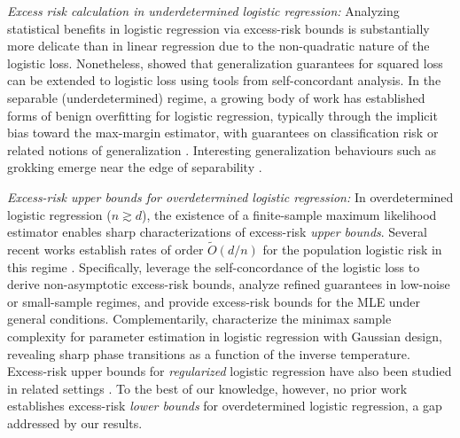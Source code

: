 \documentclass{article}
\theoremstyle{plain}
\theoremstyle{definition}
\theoremstyle{remark}
\begin{document}
{\textit{Excess risk calculation in underdetermined logistic regression:} Analyzing statistical benefits in logistic regression via excess-risk bounds is substantially more delicate than in linear regression due to the non-quadratic nature of the logistic loss. Nonetheless, \citet{bach2010self} showed that generalization guarantees for squared loss can be extended to logistic loss using tools from self-concordant analysis. In the separable (underdetermined) regime, a growing body of work has established forms of benign overfitting for logistic regression, typically through the implicit bias toward the max-margin estimator, with guarantees on classification risk or related notions of generalization \cite{montanari2019generalization, chatterji2021finite, cao2021risk, wang2022binary, muthukumar2021classification, shamir2022implicit,wu2025benefits}. Interesting generalization behaviours such as grokking emerge near the edge of separability \cite{beck2024grokking}. 

\textit{Excess-risk upper bounds for overdetermined logistic regression:}
In overdetermined logistic regression ($n \gtrsim d$), the existence of a finite-sample maximum likelihood estimator enables sharp characterizations of excess-risk \emph{upper bounds}. Several recent works establish rates of order $\tilde O(d/n)$ for the population logistic risk in this regime \cite{ostrovskii2021finite, kuchelmeister2024finite, chardon2024finite,paik2025basic}. Specifically, \citet{ostrovskii2021finite} leverage the self-concordance of the logistic loss to derive non-asymptotic excess-risk bounds, \citet{kuchelmeister2024finite} analyze refined guarantees in low-noise or small-sample regimes, and \citet{chardon2024finite} provide excess-risk bounds for the MLE under general conditions. Complementarily, \citet{hsu2024sample} characterize the minimax sample complexity for parameter estimation in logistic regression with Gaussian design, revealing sharp phase transitions as a function of the inverse temperature. Excess-risk upper bounds for \emph{regularized} logistic regression have also been studied in related settings \cite{bach2014adaptivity, marteau2019beyond, tsigler2025benign}. To the best of our knowledge, however, no prior work establishes excess-risk \emph{lower bounds} for overdetermined logistic regression, a gap addressed by our results.


}
\end{document}
